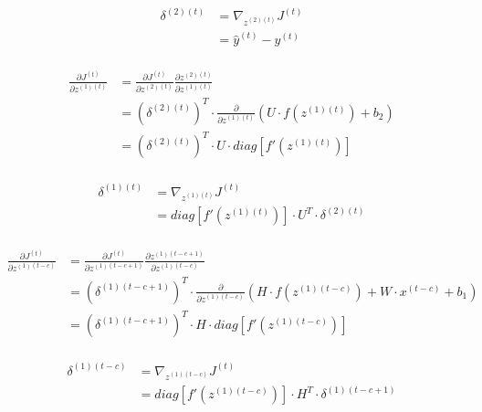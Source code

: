 \documentclass{article}
\begin{document}
	\begin{equation}
	\begin{aligned}
		\delta^{(2)(t)} &= \nabla_{z^{(2)(t)}} J^{(t)} \\
		&= \hat{y}^{(t)} - y^{(t)} \\
	\end{aligned}
	\end{equation}
	
	\begin{equation}
		\begin{aligned}
		\frac{\partial J^{(t)}}{\partial z^{(1)(t)}} &= \frac{\partial J^{(t)}}{\partial z^{(2)(t)}} 
		\frac{\partial z^{(2)(t)}}{\partial z^{(1)(t)}} \\
		&= (\delta^{(2)(t)})^T \cdot \frac{\partial}{\partial z^{(1)(t)}} (U \cdot f(z^{(1)(t)}) + b_2)\\
		&= (\delta^{(2)(t)})^T \cdot U \cdot diag[f'(z^{(1)(t)})]\\
		\end{aligned}
	\end{equation}
	
	\begin{equation}
	\begin{aligned}
		\delta^{(1)(t)} &= \nabla_{z^{(1)(t)}} J^{(t)} \\
		&= diag[f'(z^{(1)(t)})] \cdot U^T \cdot \delta^{(2)(t)}\\
	\end{aligned}
	\end{equation}
	
	\begin{equation}
		\begin{aligned}
		\frac{\partial J^{(t)}}{\partial z^{(1)(t-c)}} &= \frac{\partial J^{(t)}}{\partial z^{(1)(t-c+1)}} 
		\frac{\partial z^{(1)(t-c+1)}}{\partial z^{(1)(t-c)}} \\
		&= (\delta^{(1)(t-c+1)})^T \cdot \frac{\partial}{\partial z^{(1)(t-c)}} (H \cdot f(z^{(1)(t-c)}) + W \cdot x^{(t-c)} + b_1)\\
		&= (\delta^{(1)(t-c+1)})^T \cdot H \cdot diag[f'(z^{(1)(t-c)})]\\
		\end{aligned}
	\end{equation}
	
	\begin{equation}
		\begin{aligned}
		\delta^{(1)(t-c)} &= \nabla_{z^{(1)(t-c)}} J^{(t)} \\
		&= diag[f'(z^{(1)(t-c)})] \cdot H^T \cdot \delta^{(1)(t-c+1)}\\
		\end{aligned}
	\end{equation}
	
\end{document}
